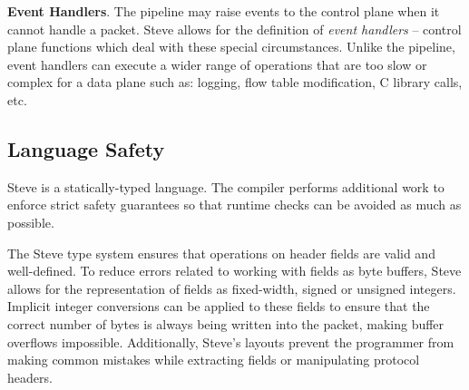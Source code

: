 \textbf{Event Handlers}.
The pipeline may raise events to the control plane when
it cannot handle a packet. Steve allows for the definition of
\emph{event handlers} -- control plane functions which deal
with these special circumstances.
Unlike the pipeline, event handlers can execute a wider range of
operations that are too slow or complex for a data plane such as:
logging, flow table modification, C library calls, etc.

%

\subsection{Language Safety}
%
%

Steve is a statically-typed language. The compiler performs additional work to
enforce strict safety guarantees so that runtime checks can be avoided as much
as possible.

The Steve type system ensures that operations on header fields are valid and
well-defined.
To reduce errors related to working with fields as byte buffers, Steve allows
for the representation of fields as fixed-width, signed or unsigned
integers.
Implicit integer conversions can be applied to these fields to ensure that the correct number of bytes is always being written into the packet, making buffer overflows impossible.
Additionally, Steve's layouts prevent the programmer from making common mistakes while extracting fields or manipulating protocol headers.


